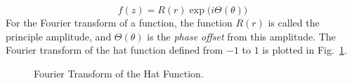     \begin{equation}
        f(z)=R(r)\exp\big(i\Theta(\theta)\big)
    \end{equation}
    For the Fourier transform of a function, the function
    $R(r)$ is called the principle amplitude, and
    $\Theta(\theta)$ is the \textit{phase offset} from
    this amplitude. The Fourier transform of the hat
    function defined from $\minus{1}$ to $1$ is plotted
    in Fig.~\ref{fig:Diff_Theory_FT_of_Hat_Func}.
    \begin{figure}[H]
        \centering
        \captionsetup{type=figure}
        \begin{subfigure}[b]{0.49\textwidth}
            \centering
        \end{subfigure}
        \begin{subfigure}[b]{0.49\textwidth}
            \centering
        \end{subfigure}
        \caption{Fourier Transform of the Hat Function.}
        \label{fig:Diff_Theory_FT_of_Hat_Func}
    \end{figure}
